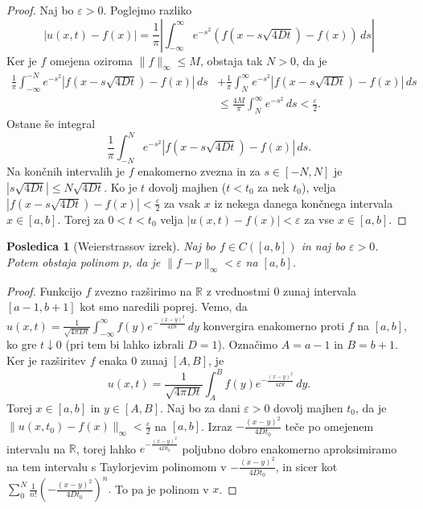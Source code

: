 \documentclass[10pt, a4paper]{article}
\newtheorem{posledica}[izr]{Posledica}
\newenvironment{noticeC}{%
  \tcolorbox[%
  notitle,
  empty,
  enhanced,  %
  breakable,
  coltext=black, 
  fontupper=\rmfamily,
  parbox=false,
  noparskip,
  sharp corners,
  boxrule=-1pt,  %
  frame hidden,
  left=7pt,  %
  right=7pt,
  top=5pt,
  bottom=5pt,
  before skip=2.5ex plus 2pt,
  after skip=2.5ex plus 2pt,
  overlay unbroken and last={%
  },
  ]}
{\endtcolorbox}
\newenvironment{dokaz}%
  {\begin{noticeC}\begin{proof}}%
  {\end{proof}\end{noticeC}}
\newcommand{\R}{\mathbb {R}}
\begin{document}
\begin{dokaz}
    Naj bo $\varepsilon > 0$.
    Poglejmo razliko 
    $$|u(x, t) - f(x)| = \frac{1}{\pi} \left| \int_{-\infty} ^\infty e^{-s^2} (f(x - s\sqrt{4Dt}) - f(x))\, ds \right|$$
    Ker je $f$ omejena oziroma $\|f\|_\infty \leq M$, obstaja tak $N > 0$, da je
    \begin{align*}
        \frac{1}{\pi} \int_{-\infty} ^{-N} e^{-s^2} |f(x - s\sqrt{4 Dt}) - f(x)|\, ds
        &+ \frac{1}{\pi} \int_{N} ^{\infty} e^{-s^2} |f(x - s\sqrt{4 Dt}) - f(x)|\, ds\\
        &\leq \frac{4 M}{\pi} \int_{N} ^\infty e^{-s^2}\, ds < \frac{\varepsilon}{2}.
    \end{align*}
    Ostane še integral $$\frac{1}{\pi} \int_{-N} ^{N} e^{-s^2} |f(x - s\sqrt{4 Dt}) - f(x)|\, ds.$$
    Na končnih intervalih je $f$ enakomerno zvezna in za $s \in [-N, N]$ je $|s \sqrt{4 D t} | \leq N \sqrt{4 D t}$.
    Ko je $t$ dovolj majhen ($t < t_0$ za nek $t_0$), velja $|f(x - s \sqrt{4 D t}) - f(x)| < \frac{\varepsilon}{2}$
    za vsak $x$ iz nekega danega končnega intervala $x \in [a, b]$.
    Torej za $0 < t < t_0$ velja $|u(x, t) - f(x) | < \varepsilon$ za vse $x \in [a, b]$.
\end{dokaz}

\begin{posledica}[Weierstrassov izrek]
    Naj bo $f \in C([a, b])$ in naj bo $\varepsilon > 0$.
    Potem obstaja polinom $p$, da je $\|f - p\|_{\infty} < \varepsilon$ na $[a, b]$.
\end{posledica}


\begin{dokaz}
    Funkcijo $f$ zvezno razširimo na $\R$ z vrednostmi $0$ zunaj intervala $[a - 1, b + 1]$
    kot smo naredili poprej.
    Vemo, da $u(x, t) = \frac{1}{\sqrt{4 \pi D t}} \int_{-\infty} ^\infty f(y) e^{-\frac{(x - y)^2}{4Dt}}\, dy$
    konvergira enakomerno proti $f$ na $[a, b]$, ko gre $t \downarrow 0$ (pri tem bi lahko izbrali $D = 1$).
    Označimo $A = a -1$ in $B = b + 1$. Ker je razširitev $f$ enaka 
    $0$ zunaj $[A, B]$, je $$u(x, t) = \frac{1}{\sqrt{4 \pi D t}} \int_{A} ^B f(y) e^{-\frac{(x - y)^2}{4Dt}}\, dy.$$
    Torej $x \in [a, b]$ in $y \in [A, B]$.
    Naj bo za dani $\varepsilon > 0$ dovolj majhen $t_0$, da je 
    $\| u(x, t_0) - f(x)\|_\infty < \frac{\varepsilon}{2}$ na $[a, b]$.
    Izraz ${-\frac{(x - y)^2}{4Dt_0}}$ teče po omejenem intervalu na $\R$,
    torej lahko $e^{{-\frac{(x - y)^2}{4Dt_0}}}$ poljubno dobro enakomerno aproksimiramo na tem intervalu s Taylorjevim 
    polinomom v ${-\frac{(x - y)^2}{4Dt_0}}$, in sicer kot $\sum_0 ^N \frac{1}{n!} \left(-\frac{(x -y)^2}{4Dt_0}\right)^n.$
    To pa je polinom v $x$.
\end{dokaz}
\end{document}
